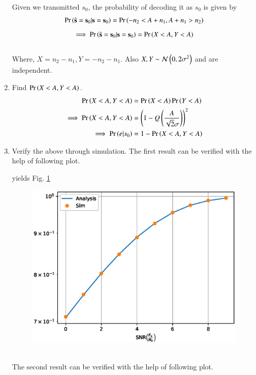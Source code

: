 \documentclass[journal,12pt,twocolumn]{IEEEtran}
\begin{document}
\begin{problem}
\begin{enumerate}
\\
\solution Given we transmitted $s_0$, the probability of decoding it as $s_0$ is given by 
\begin{equation}
\Pr\left(\hat{\mathbf{s}} = \mathbf{s}_0|\mathbf{s} = \mathbf{s}_0\right) = \Pr\left(-n_2<A+n_1,A+n_1>n_2\right) 
\end{equation}
\begin{equation}
\implies \Pr\left(\hat{\mathbf{s}} = \mathbf{s}_0|\mathbf{s} = \mathbf{s}_0\right) = \Pr\left(X<A,Y<A\right)
\end{equation}
\\
Where, $X=n_2-n_1, Y=-n_2-n_1$. Also $X,Y \sim \mathcal{N}\left(0,2\sigma^2\right)$ and are independent. 
\item Find $\Pr\left( X < A,  Y < A\right)$.
\\
\solution 
\begin{align}
\Pr\left(X < A, Y < A\right) &= \Pr\left(X < A\right)\Pr\left(Y < A\right)
\\
\implies \Pr\left(X < A, Y < A\right) &= \left(1-Q\left(\frac{A}{\sqrt{2}\sigma}\right)\right)^2
\\
\implies \Pr\left(e|s_0\right) &= 1-\Pr\left(X < A,Y < A\right)
\end{align}
\item Verify the above through simulation.
\solution 
The first result can be verified with the help of following plot.

yields Fig. \ref{fig:qpsk}
\begin{figure}[!h]
\centering
\includegraphics[width=\columnwidth]{./figs/qpsk.eps}
\caption{}
\label{fig:qpsk}
\end{figure}
\\
The second result can be verified with the help of following plot.

\end{enumerate}
\end{problem}
\end{document}
